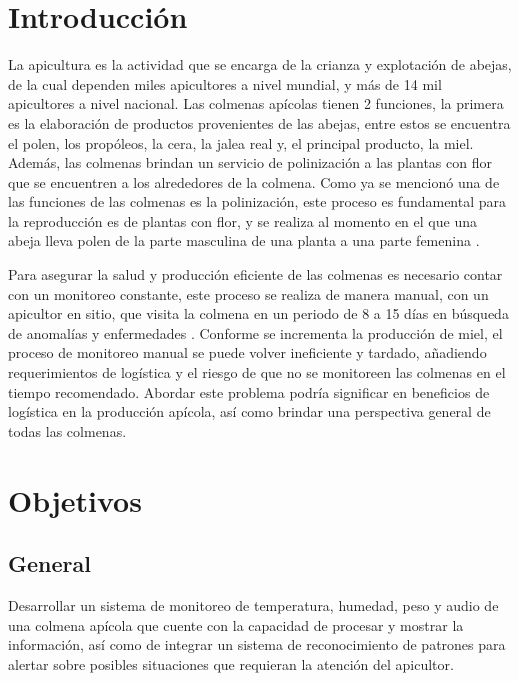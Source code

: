\documentclass[journal]{IEEEtran} %
\begin{document}
\section{Introducción}
La apicultura es la actividad que se encarga de la crianza y explotación de abejas, de la cual dependen miles apicultores a nivel mundial, y más de 14 mil apicultores a nivel nacional.
Las colmenas apícolas tienen 2 funciones, la primera es la elaboración de productos provenientes de las abejas, entre estos se encuentra el polen, los propóleos, la cera, la jalea real y, el principal producto, la miel. Además, las colmenas brindan un servicio de polinización a las plantas con flor que se encuentren a los alrededores de la colmena.
Como ya se mencionó una de las funciones de las colmenas es la polinización, este proceso es fundamental para la reproducción es de plantas con flor, y se realiza al momento en el que una abeja lleva polen de la parte masculina de una planta a una parte femenina \cite{Bradbear2005LaSostenible} \cite{DataMexico2023TrabajadoresMexico}.

Para asegurar la salud y producción eficiente de las colmenas es necesario contar con un monitoreo constante, este proceso se realiza de manera manual, con un apicultor en sitio, que visita la colmena en un periodo de 8 a 15 días en búsqueda de anomalías y enfermedades \cite{MVZ.AdrianaCorreaBenitez2018BUENASMIEL}.
Conforme se incrementa la producción de miel, el proceso de monitoreo manual se puede volver ineficiente y tardado, añadiendo requerimientos de logística y el riesgo de que no se monitoreen las colmenas en el tiempo recomendado. 
Abordar este problema podría significar en beneficios de logística en la producción apícola, así como brindar una perspectiva general de todas las colmenas.

\section{Objetivos}

\subsection{General}

Desarrollar un sistema de monitoreo de temperatura, humedad, peso y audio de una colmena apícola que cuente con la capacidad de procesar y mostrar la información, así como de integrar un sistema de reconocimiento de patrones para alertar sobre posibles situaciones que requieran la atención del apicultor. 
\end{document}
